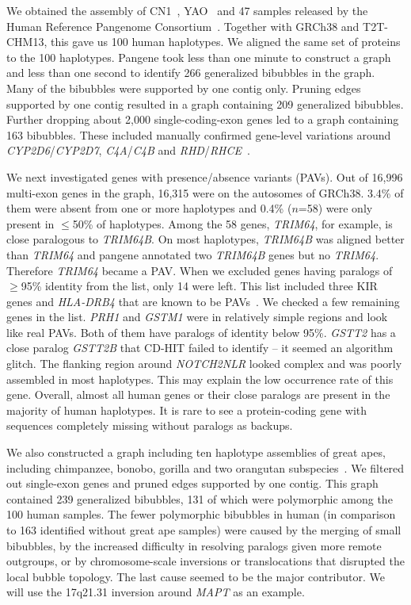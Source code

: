 \documentclass[webpdf,contemporary,large,namedate]{oup-authoring-template}%
\begin{document}
We obtained the assembly of CN1~\citep{Yang:2023aa}, YAO~\citep{He:2023aa} and 47 samples released by the Human Reference Pangenome Consortium~\citep{Liao:2023aa}.
Together with GRCh38 and T2T-CHM13, this gave us 100 human haplotypes.
We aligned the same set of proteins to the 100 haplotypes.
Pangene took less than one minute to construct a graph
and less than one second to identify 266 generalized bibubbles in the graph.
Many of the bibubbles were supported by one contig only.
Pruning edges supported by one contig resulted in a graph containing 209 generalized bibubbles.
Further dropping about 2,000 single-coding-exon genes led to a graph containing 163 bibubbles.
These included manually confirmed gene-level variations around {\it CYP2D6}/{\it CYP2D7}, {\it C4A}/{\it C4B} and
{\it RHD}/{\it RHCE}~\citep{Liao:2023aa}.

We next investigated genes with presence/absence variants (PAVs).
Out of 16,996 multi-exon genes in the graph,
16,315 were on the autosomes of GRCh38.
3.4\% of them were absent from one or more haplotypes and 0.4\% ($n$=58) were only present in $\le$50\% of haplotypes.
Among the 58 genes, \emph{TRIM64}, for example, is close paralogous to \emph{TRIM64B}.
On most haplotypes, \emph{TRIM64B} was aligned better than \emph{TRIM64} and pangene annotated two \emph{TRIM64B} genes but no \emph{TRIM64}.
Therefore \emph{TRIM64} became a PAV.
When we excluded genes having paralogs of $\ge$95\% identity from the list, only 14 were left.
This list included three KIR genes and \emph{HLA-DRB4} that are known to be PAVs~\citep{Zhou2024.01.20.576452}.
We checked a few remaining genes in the list.
\emph{PRH1} and \emph{GSTM1} were in relatively simple regions and look like real PAVs.
Both of them have paralogs of identity below 95\%.
\emph{GSTT2} has a close paralog \emph{GSTT2B} that CD-HIT failed to identify -- it seemed an algorithm glitch.
The flanking region around \emph{NOTCH2NLR} looked complex and was poorly assembled in most haplotypes.
This may explain the low occurrence rate of this gene.
Overall, almost all human genes or their close paralogs are present in the majority of human haplotypes.
It is rare to see a protein-coding gene with sequences completely missing without paralogs as backups.

We also constructed a graph including ten haplotype assemblies of great apes, including chimpanzee, bonobo, gorilla
and two orangutan subspecies~\citep{Makova2023.11.30.569198}.
We filtered out single-exon genes and pruned edges supported by one contig.
This graph contained 239 generalized bibubbles, 131 of which were polymorphic among the 100 human samples.
The fewer polymorphic bibubbles in human (in comparison to 163 identified without great ape samples)
were caused by the merging of small bibubbles,
by the increased difficulty in resolving paralogs given more remote outgroups,
or by chromosome-scale inversions or translocations that disrupted the local bubble topology.
The last cause seemed to be the major contributor.
We will use the 17q21.31 inversion around \emph{MAPT} as an example.
\end{document}
